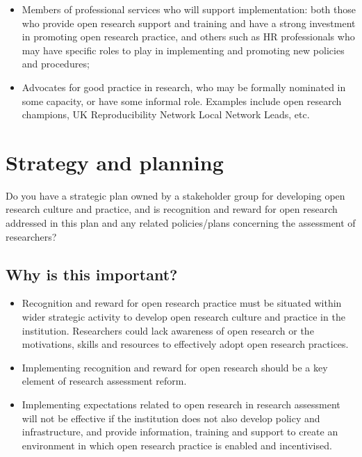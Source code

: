 \documentclass[
  letterpaper,
  DIV=11,
  numbers=noendperiod,
  oneside]{scrreprt}
\begin{document}
\begin{itemize}
\item
  Members of professional services who will support implementation: both
  those who provide open research support and training and have a strong
  investment in promoting open research practice, and others such as HR
  professionals who may have specific roles to play in implementing and
  promoting new policies and procedures;
\item
  Advocates for good practice in research, who may be formally nominated
  in some capacity, or have some informal role. Examples include open
  research champions, UK Reproducibility Network Local Network Leads,
  etc.
\end{itemize}


\chapter{Strategy and planning}\label{strategy-and-planning}

\begin{tcolorbox}[enhanced jigsaw, colback=white, toprule=.15mm, colframe=quarto-callout-color-frame, arc=.35mm, opacityback=0, bottomrule=.15mm, breakable, left=2mm, leftrule=.75mm, rightrule=.15mm]

Do you have a strategic plan owned by a stakeholder group for developing
open research culture and practice, and is recognition and reward for
open research addressed in this plan and any related policies/plans
concerning the assessment of researchers?

\end{tcolorbox}

\section{Why is this important?}\label{why-is-this-important-2}

\begin{itemize}
\item
  Recognition and reward for open research practice must be situated
  within wider strategic activity to develop open research culture and
  practice in the institution. Researchers could lack awareness of open
  research or the motivations, skills and resources to effectively adopt
  open research practices.
\item
  Implementing recognition and reward for open research should be a key
  element of research assessment reform.
\item
  Implementing expectations related to open research in research
  assessment will not be effective if the institution does not also
  develop policy and infrastructure, and provide information, training
  and support to create an environment in which open research practice
  is enabled and incentivised.
\end{itemize}
\end{document}
